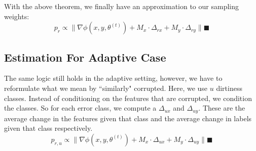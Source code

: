 With the above theorem, we finally have an approximation to our sampling weights: 
\[p_{r}\propto\|\nabla\phi(x,y,\theta^{(t)}) + M_x \cdot \Delta_{rx} +  M_y \cdot \Delta_{ry}\|
\blacksquare
\]

\subsection{Estimation For Adaptive Case}
The same logic still holds in the adaptive setting, however, we have to reformulate what we mean by ``similarly" corrupted.
Here, we use $u$ dirtiness classes.
Instead of conditioning on the features that are corrupted, we condition the classes.
So for each error class, we compute a $\Delta_{ux}$ and $\Delta_{uy}$.
These are the average change in the features given that class and the average change in labels given that class respectively.
\[
p_{r,u}\propto\|\nabla\phi(x,y,\theta^{(t)}) + M_x \cdot \Delta_{ux} +  M_y \cdot \Delta_{uy}\|
\blacksquare
\] 

